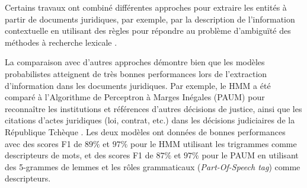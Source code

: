 Certains travaux ont combiné différentes approches pour extraire les entités à partir de documents juridiques,  par exemple,  par la description de l'information contextuelle en utilisant des règles pour répondre au problème d'ambiguïté des méthodes à recherche lexicale \citep{mikheev1999NERlexicalWithRules,hanisch2005prominer}. 

La comparaison avec d'autres approches démontre bien que les modèles probabilistes atteignent de très bonnes performances lors de l'extraction d'information dans les documents juridiques. Par exemple, le HMM a été comparé à l'Algorithme de Perceptron à Marges Inégales (PAUM) \citep{li2002PAUM} pour reconnaître les institutions et références d'autres décisions de justice, ainsi que les citations d'actes juridiques (loi, contrat, etc.) dans les décisions judiciaires de la République Tchèque \citep{Kriz2014nerinczechdecisions}. Les deux modèles ont données de bonnes performances avec des scores F1 de $ 89 \% $ et $ 97 \% $ pour le HMM utilisant les trigrammes comme descripteurs de mots, et des scores F1 de $ 87 \% $ et $ 97 \% $ pour le PAUM en utilisant des 5-grammes de lemmes et les rôles grammaticaux (\textit{Part-Of-Speech tag}) comme descripteurs. 


